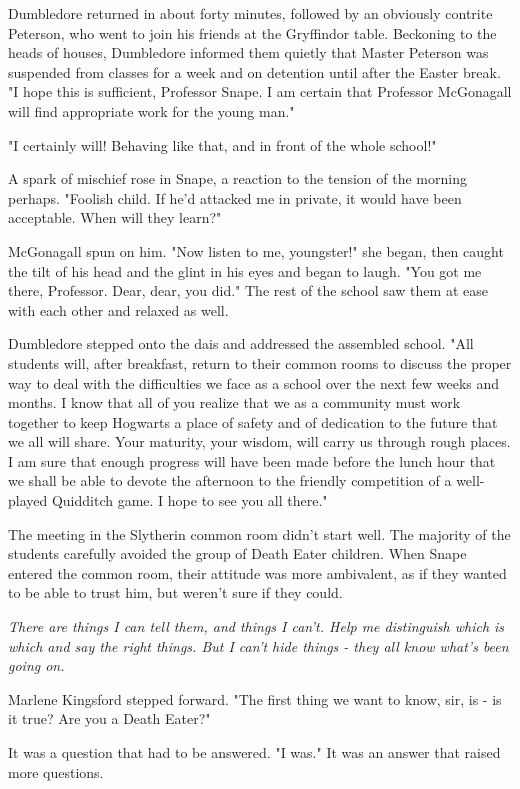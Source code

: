 Dumbledore returned in about forty minutes, followed by an obviously contrite Peterson, who went to join his friends at the Gryffindor table. Beckoning to the heads of houses, Dumbledore informed them quietly that Master Peterson was suspended from classes for a week and on detention until after the Easter break. "I hope this is sufficient, Professor Snape. I am certain that Professor McGonagall will find appropriate work for the young man."

"I certainly will! Behaving like that, and in front of the whole school!"

A spark of mischief rose in Snape, a reaction to the tension of the morning perhaps. "Foolish child. If he'd attacked me in private, it would have been acceptable. When will they learn?"

McGonagall spun on him. "Now listen to me, youngster!" she began, then caught the tilt of his head and the glint in his eyes and began to laugh. "You got me there, Professor. Dear, dear, you did." The rest of the school saw them at ease with each other and relaxed as well.

Dumbledore stepped onto the dais and addressed the assembled school. "All students will, after breakfast, return to their common rooms to discuss the proper way to deal with the difficulties we face as a school over the next few weeks and months. I know that all of you realize that we as a community must work together to keep Hogwarts a place of safety and of dedication to the future that we all will share. Your maturity, your wisdom, will carry us through rough places. I am sure that enough progress will have been made before the lunch hour that we shall be able to devote the afternoon to the friendly competition of a well-played Quidditch game. I hope to see you all there."

The meeting in the Slytherin common room didn't start well. The majority of the students carefully avoided the group of Death Eater children. When Snape entered the common room, their attitude was more ambivalent, as if they wanted to be able to trust him, but weren't sure if they could.

\emph{There are things I can tell them, and things I can't. Help me distinguish which is which and say the right things. But I can't hide things - they all know what's been going on.}

Marlene Kingsford stepped forward. "The first thing we want to know, sir, is - is it true? Are you a Death Eater?"

It was a question that had to be answered. "I was." It was an answer that raised more questions.

